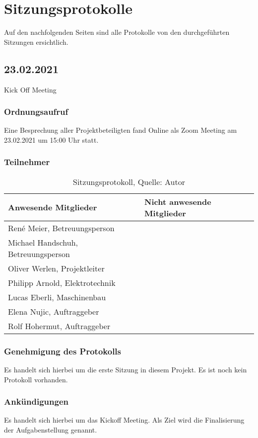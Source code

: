 \section{Sitzungsprotokolle}
Auf den nachfolgenden Seiten sind alle Protokolle von den durchgeführten Sitzungen ersichtlich.
\subsection{23.02.2021}\label{kickOff}
Kick Off Meeting
\subsubsection{Ordnungsaufruf}
Eine Besprechung aller Projektbeteiligten fand Online als Zoom Meeting am 23.02.2021 um 15:00 Uhr statt.
\subsubsection{Teilnehmer}
\begin{table}[H]
	\setlength\extrarowheight{2pt} %
	\begin{tabularx}{\textwidth}{|X|X|}
		\hline
		\textbf{Anwesende Mitglieder} &  \textbf{Nicht anwesende Mitglieder} \\
		\hline
		René Meier, Betreuungsperson & \\
		Michael Handschuh, Betreuungsperson &\\
		Oliver Werlen, Projektleiter &  \\
		Philipp Arnold, Elektrotechnik & \\
		Lucas Eberli, Maschinenbau & \\
		Elena Nujic, Auftraggeber & \\
		Rolf Hohermut, Auftraggeber &\\
		\hline
	\end{tabularx}
	\caption{ \label{tbl: Teilnehmerliste vom 23.02.2021}Sitzungsprotokoll, Quelle: Autor}
\end{table}
\subsubsection{Genehmigung des Protokolls}
Es handelt sich hierbei um die erste Sitzung in diesem Projekt. Es ist noch kein Protokoll vorhanden. 
\subsubsection{Ankündigungen}
Es handelt sich hierbei um das Kickoff Meeting. Als Ziel wird die Finalisierung der Aufgabenstellung genannt. 
